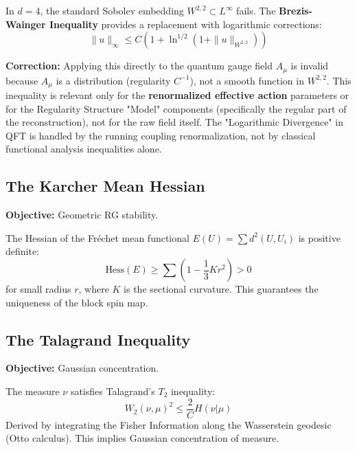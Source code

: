 \begin{strategy}
In $d=4$, the standard Sobolev embedding $W^{2,2} \subset L^\infty$ fails. The \textbf{Brezis-Wainger Inequality} provides a replacement with logarithmic corrections:
\begin{equation}
\|u\|_\infty \leq C (1 + \ln^{1/2}(1 + \|u\|_{W^{2,2}}))
\end{equation}
\end{strategy}

\textbf{Correction:} Applying this directly to the quantum gauge field $A_\mu$ is invalid because $A_\mu$ is a distribution (regularity $C^{-1}$), not a smooth function in $W^{2,2}$.
This inequality is relevant only for the \textbf{renormalized effective action} parameters or for the Regularity Structure "Model" components (specifically the regular part of the reconstruction), not for the raw field itself.
The "Logarithmic Divergence" in QFT is handled by the running coupling renormalization, not by classical functional analysis inequalities alone.

\subsection{The Karcher Mean Hessian}
\textbf{Objective:} Geometric RG stability.

\begin{theorem}
The Hessian of the Fréchet mean functional $E(U) = \sum d^2(U, U_i)$ is positive definite:
\begin{equation}
\text{Hess}(E) \ge \sum (1 - \frac{1}{3} K r^2) > 0
\end{equation}
for small radius $r$, where $K$ is the sectional curvature. This guarantees the uniqueness of the block spin map.
\end{theorem}

\subsection{The Talagrand Inequality}
\textbf{Objective:} Gaussian concentration.

\begin{theorem}
The measure $\nu$ satisfies Talagrand's $T_2$ inequality:
\begin{equation}
W_2(\nu, \mu)^2 \leq \frac{2}{C} H(\nu | \mu)
\end{equation}
Derived by integrating the Fisher Information along the Wasserstein geodesic (Otto calculus). This implies Gaussian concentration of measure.
\end{theorem}

